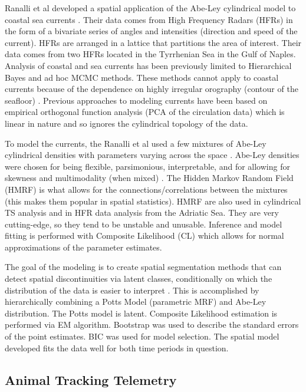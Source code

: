 
Ranalli et al developed a spatial application of the Abe-Ley cylindrical model to coastal sea currents \cite{ranalli_segmentation_2018}. Their data comes from High Frequency Radars (HFRs) in the form of a bivariate series of angles and intensities (direction and speed of the current). HFRs are arranged in a lattice that partitions the area of interest. Their data comes from two HFRs located in the Tyrrhenian Sea in the Gulf of Naples. Analysis of coastal and sea currents has been previously limited to Hierarchical Bayes and ad hoc MCMC methods. These methods cannot apply to coastal currents because of the dependence on highly irregular orography (contour of the seafloor) \cite{ranalli_segmentation_2018}. Previous approaches to modeling currents have been based on empirical orthogonal function analysis (PCA of the circulation data) which is linear in nature and so ignores the cylindrical topology of the data.

To model the currents, the Ranalli et al used a few mixtures of Abe-Ley cylindrical densities with parameters varying across the space \cite{ranalli_segmentation_2018}. Abe-Ley densities were chosen for being flexible, parsimonious, interpretable, and for allowing for skewness and multimodality (when mixed) \cite{abe_tractable_2017}. The Hidden Markov Random Field (HMRF) is what allows for the connections/correlations between the mixtures (this makes them popular in spatial statistics). HMRF are also used in cylindrical TS analysis and in HFR data analysis from the Adriatic Sea. They are very cutting-edge, so they tend to be unstable and unusable. Inference and model fitting is performed with Composite Likelihood (CL) which allows for normal approximations of the parameter estimates.  

The goal of the modeling is to create spatial segmentation methods that can detect spatial discontinuities via latent classes, conditionally on which the distribution of the data is easier to interpret \cite{ranalli_segmentation_2018}. This is accomplished by hierarchically combining a Potts Model (parametric MRF) and Abe-Ley distribution. The Potts model is latent. Composite Likelihood estimation is performed via EM algorithm. Bootstrap was used to describe the standard errors of the point estimates. BIC was used for model selection. The spatial model developed fits the data well for both time periods in question. 

\subsection{Animal Tracking Telemetry}

